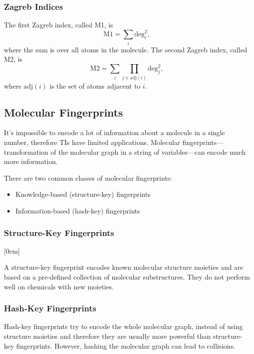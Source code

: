 \subsubsection*{Zagreb Indices}

The first Zagreb index, called M1, is 
\[
    \text{M1} = \sum_{i} \text{deg}_i^2,
\]
where the sum is over all atoms in the molecule. The second Zagreb index, called M2, is
\[
    \text{M2} = \sum_{i}\prod_{j \in \text{adj}(i)} \text{deg}_j^2,
\]
where $\text{adj}(i)$ is the set of atoms adjacent to $i$.


\subsection{Molecular Fingerprints}

It's impossible to encode a lot of information about a molecule in a single number, therefore TIs have limited applications. Molecular fingerprints---transformation of the molecular graph in a string of variables---can encode much more information.

There are two common classes of molecular fingerprints:
\begin{itemize}
    \item Knowledge-based (structure-key) fingerprints 
    \item Information-based (hash-key) fingerprints 
\end{itemize}


\subsubsection*{Structure-Key Fingerprints}

[0cm]

A structure-key fingerprint encodes known molecular structure moieties and are based on a pre-defined collection of molecular substructures. They do not perform well on chemicals with new moieties.


\subsubsection*{Hash-Key Fingerprints}


Hash-key fingerprints try to encode the whole molecular graph, instead of using structure moieties and therefore they are usually more powerful than structure-key fingerprints. However, hashing the molecular graph can lead to collisions.

